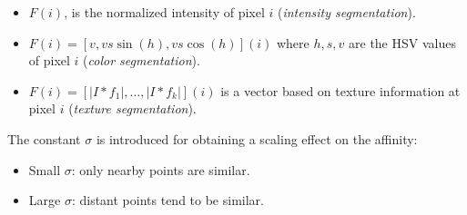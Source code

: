 \begin{itemize}
	\item $F(i)$, is the normalized intensity of pixel $i$ (\textit{intensity segmentation}).
	\item $F(i) = [v, vs\sin(h), vs\cos(h)](i)$ where $h,s,v$ are the HSV values of pixel $i$ (\textit{color segmentation}).
	\item $F(i) = [|I*f_1|, \dots, |I*f_k|](i)$ is a vector based on texture information at pixel $i$ (\textit{texture segmentation}).
\end{itemize}
The constant $\sigma$ is introduced for obtaining a scaling effect on the affinity:
\begin{itemize}
	\item Small $\sigma$: only nearby points are similar.%
	\item Large $\sigma$: distant points tend to be similar.%
\end{itemize}


